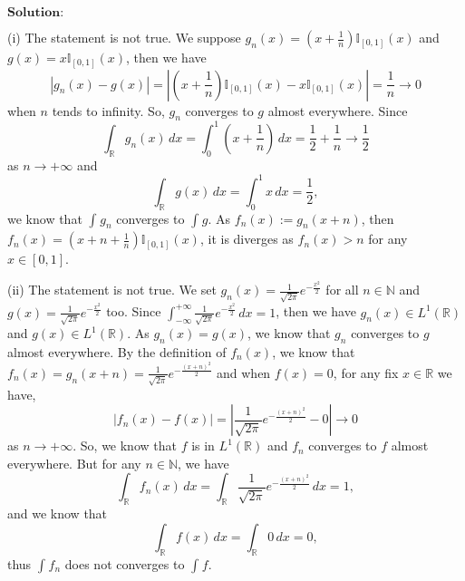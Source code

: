 \documentclass[12pt,a4paper]{ctexart}
\begin{document}
\vspace{8pt}
$\textbf{Solution:}$

(i) The statement is not true. We suppose $g_{n}(x) = (x + \frac{1}{n}) \mathbb{I}_{[0, 1]} (x)$ and $g(x) = x \mathbb{I}_{[0, 1]} (x)$, then we have
\begin{equation*}
   |g_{n} (x) - g(x) | = | (x + \frac{1}{n}) \mathbb{I}_{[0, 1]} (x) - x \mathbb{I}_{[0, 1]} (x) | = \frac{1}{n} \to 0
\end{equation*}
when $n$ tends to infinity. So, $g_{n}$ converges to $g$ almost everywhere. Since 
\begin{equation*}
   \int_{\mathbb{R}}^{} g_{n}(x) \, d x = \int_{0}^{1} (x + \frac{1}{n}) \, d x = \frac{1}{2} + \frac{1}{n} \to \frac{1}{2} 
\end{equation*}
as $n \to + \infty$ and
\begin{equation*}
   \int_{\mathbb{R}}^{} g (x) \, d x = \int_{0}^{1} x \, d x = \frac{1}{2},
\end{equation*}
we know that $\int_{}^{} g_{n} $ converges to $\int_{}^{} g$. As $f_{n}(x) := g_{n}(x + n)$, then $f_{n} (x) = (x + n + \frac{1}{n}) \mathbb{I}_{[0, 1]} (x)$, it is diverges as $f_{n} (x) > n$ for any $x \in [0, 1]$.

(ii) The statement is not true. We set $g_{n} (x) = \frac{1}{\sqrt{2 \pi}} e^{- \frac{x^{2}}{2}}$ for all $n \in \mathbb{N}$ and $g (x) = \frac{1}{\sqrt{2 \pi}} e^{- \frac{x^{2}}{2}}$ too. Since $\int_{- \infty}^{+ \infty} \frac{1}{\sqrt{2 \pi}} e^{- \frac{x^{2}}{2}} \, d x = 1$, then we have $g_{n} (x) \in L^{1}(\mathbb{R})$ and $g(x) \in L^{1}(\mathbb{R})$. As $g_{n} (x) = g(x)$, we know that $g_{n}$ converges to $g$ almost everywhere. By the definition of $f_{n}(x)$, we know that $f_{n}(x) = g_{n} (x + n) = \frac{1}{\sqrt{2 \pi}} e^{- \frac{(x+n)^{2}}{2}}$ and when $f(x) = 0$, for any fix $x \in \mathbb{R}$ we have,
\begin{equation*}
   |f_{n}(x) - f(x)| = |\frac{1}{\sqrt{2 \pi}} e^{- \frac{(x+n)^{2}}{2}} - 0| \to 0 
\end{equation*}
as $n \to + \infty$. So, we know that $f$ is in $L^{1}(\mathbb{R})$ and $f_{n}$ converges to $f$ almost everywhere. But for any $n \in \mathbb{N}$, we have
\begin{equation*}
   \int_{\mathbb{R}}^{} f_{n} (x) \, d x = \int_{\mathbb{R}}^{} \frac{1}{\sqrt{2 \pi}} e^{- \frac{(x+n)^{2}}{2}} \, d x = 1,
\end{equation*}
and we know that
\begin{equation*}
   \int_{\mathbb{R}}^{} f (x) \, d x = \int_{\mathbb{R}}^{} 0 \, d x = 0,
\end{equation*}
thus $\int_{}^{} f_{n}$ does not converges to $\int_{}^{} f$. 
\end{document}

